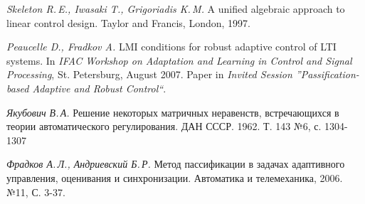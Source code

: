 \begin{thebibliography}{wlab}
\emph{Skeleton R.\,E., Iwasaki T., Grigoriadis K.\,M.}
\newblock A unified algebraic approach to linear control design.
\newblock Taylor and Francis, London, 1997.

\emph{Peaucelle D., Fradkov A.}
\newblock LMI conditions for robust adaptive control of LTI systems.
\newblock In \emph{IFAC Workshop on Adaptation and Learning in Control and Signal Processing}, St. Petersburg, August 2007. Paper
in \emph{Invited Session ''Passification-based Adaptive and Robust Control``}.

\emph{Якубович В.\,А.}
\newblock Решение некоторых матричных неравенств, встречающихся в теории автоматического регулирования.
\newblock ДАН СССР. 1962. Т. 143 №6, с. 1304-1307

\emph{Фрадков А.\,Л., Андриевский Б.\,Р.}
\newblock Метод пассификации в задачах адаптивного управления, оценивания и синхронизации.
\newblock Автоматика и телемеханика, 2006. №11, С. 3-37.



\end{thebibliography}
